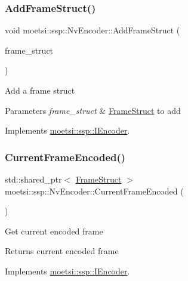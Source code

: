 \subsubsection{\texorpdfstring{Add\+Frame\+Struct()}{AddFrameStruct()}}
{\footnotesize\ttfamily void moetsi\+::ssp\+::\+Nv\+Encoder\+::\+Add\+Frame\+Struct (\begin{DoxyParamCaption}\item[{std\+::shared\+\_\+ptr$<$ \hyperlink{structmoetsi_1_1ssp_1_1FrameStruct}{Frame\+Struct} $>$ \&}]{frame\+\_\+struct }\end{DoxyParamCaption})\hspace{0.3cm}{\ttfamily [virtual]}}

Add a frame struct 
\begin{DoxyParams}{Parameters}
{\em frame\+\_\+struct} & \hyperlink{structmoetsi_1_1ssp_1_1FrameStruct}{Frame\+Struct} to add \\
\hline
\end{DoxyParams}


Implements \hyperlink{classmoetsi_1_1ssp_1_1IEncoder_a8c223ec82fdd30ee8ee75157306054ec}{moetsi\+::ssp\+::\+I\+Encoder}.

\mbox{\label{classmoetsi_1_1ssp_1_1NvEncoder_adbc7d498e797af8c5bb31b5a2a82efdd}} 
\subsubsection{\texorpdfstring{Current\+Frame\+Encoded()}{CurrentFrameEncoded()}}
{\footnotesize\ttfamily std\+::shared\+\_\+ptr$<$ \hyperlink{structmoetsi_1_1ssp_1_1FrameStruct}{Frame\+Struct} $>$ moetsi\+::ssp\+::\+Nv\+Encoder\+::\+Current\+Frame\+Encoded (\begin{DoxyParamCaption}{ }\end{DoxyParamCaption})\hspace{0.3cm}{\ttfamily [virtual]}}

Get current encoded frame \begin{DoxyReturn}{Returns}
current encoded frame 
\end{DoxyReturn}


Implements \hyperlink{classmoetsi_1_1ssp_1_1IEncoder_a178d117518e7c7007414ea9c82bd3ed6}{moetsi\+::ssp\+::\+I\+Encoder}.

